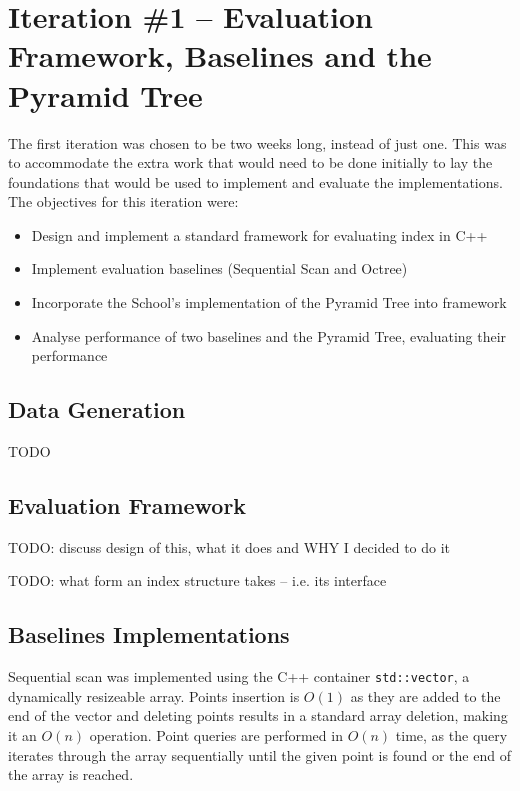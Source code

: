 \section{Iteration \#1 -- Evaluation Framework, Baselines and the Pyramid Tree}

The first iteration was chosen to be two weeks long, instead of just one. This was to accommodate the extra work that would need to be done initially to lay the foundations that would be used to implement and evaluate the implementations. The objectives for this iteration were:
\begin{itemize}
	\item Design and implement a standard framework for evaluating index in C++
	\item Implement evaluation baselines (Sequential Scan and Octree)
	\item Incorporate the School's implementation of the Pyramid Tree into framework
	\item Analyse performance of two baselines and the Pyramid Tree, evaluating their performance
\end{itemize}

\subsection{Data Generation}

TODO

\subsection{Evaluation Framework}

TODO: discuss design of this, what it does and WHY I decided to do it

TODO: what form an index structure takes -- i.e. its interface

\subsection{Baselines Implementations}

Sequential scan was implemented using the C++ container \texttt{std::vector}, a dynamically resizeable array. Points insertion is $O(1)$ as they are added to the end of the vector and deleting points results in a standard array deletion, making it an $O(n)$ operation. Point queries are performed in $O(n)$ time, as the query iterates through the array sequentially until the given point is found or the end of the array is reached.


